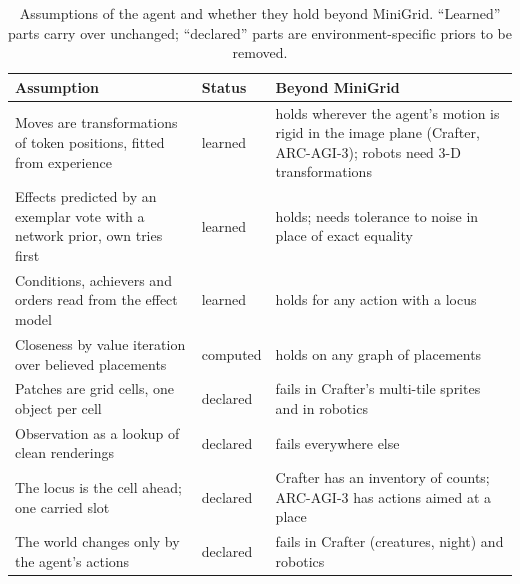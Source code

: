\documentclass{article}
\begin{document}
\begin{table}[t]
    \caption{Assumptions of the agent and whether they hold beyond MiniGrid. ``Learned'' parts carry over unchanged; ``declared'' parts are environment-specific priors to be removed.}
    \centering
    \small
    \begin{tabular}{>{\raggedright\arraybackslash}p{5.2cm} >{\raggedright\arraybackslash}p{2.0cm} >{\raggedright\arraybackslash}p{5.6cm}}
        \toprule
        Assumption & Status & Beyond MiniGrid \\
        \midrule
        Moves are transformations of token positions, fitted from experience & learned & holds wherever the agent's motion is rigid in the image plane (Crafter, ARC-AGI-3); robots need 3-D transformations \\
        Effects predicted by an exemplar vote with a network prior, own tries first & learned & holds; needs tolerance to noise in place of exact equality \\
        Conditions, achievers and orders read from the effect model & learned & holds for any action with a locus \\
        Closeness by value iteration over believed placements & computed & holds on any graph of placements \\
        Patches are grid cells, one object per cell & declared & fails in Crafter's multi-tile sprites and in robotics \\
        Observation as a lookup of clean renderings & declared & fails everywhere else \\
        The locus is the cell ahead; one carried slot & declared & Crafter has an inventory of counts; ARC-AGI-3 has actions aimed at a place \\
        The world changes only by the agent's actions & declared & fails in Crafter (creatures, night) and robotics \\
        \bottomrule
    \end{tabular}
    \label{tab:portability}
\end{table}
\end{document}

